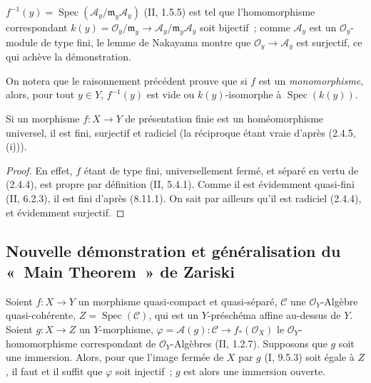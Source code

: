 $f^{-1}(y)=\operatorname{Spec}(\mathcal A_y/\mathfrak m_y\mathcal A_y)$
(II, 1.5.5) est tel que l'homomorphisme correspondant
$k(y)=\mathcal O_y/\mathfrak m_y\to
\mathcal A_y/\mathfrak m_y\mathcal A_y$ soit bijectif~; comme $\mathcal A_y$
est un $\mathcal O_y$-module de type fini, le lemme de Nakayama montre que
$\mathcal O_y\to\mathcal A_y$ est surjectif, ce qui achève la démonstration.

\begin{remark}[8.11.5.1]
\label{IV.8.11.5.1-fr}
On notera que le raisonnement précédent prouve que si $f$ est un
\emph{monomorphisme}, alors, pour tout $y\in Y$, $f^{-1}(y)$ est vide ou
$k(y)$-isomorphe à $\operatorname{Spec}(k(y))$.
\end{remark}

\begin{proposition}[8.11.6]
\label{IV.8.11.6-fr}
Si un morphisme $f:X\to Y$ de présentation finie est un homéomorphisme
universel, il est fini, surjectif et radiciel (la réciproque étant vraie
d'après (2.4.5, (i))).
\end{proposition}

\begin{proof}
En effet, $f$ étant de type fini, universellement fermé, et séparé en vertu de
(2.4.4), est propre par définition (II, 5.4.1). Comme il est évidemment
quasi-fini (II, 6.2.3), il est fini d'après (8.11.1). On sait par ailleurs
qu'il est radiciel (2.4.4), et évidemment surjectif.
\end{proof}

\subsection{Nouvelle démonstration et généralisation du «~Main Theorem~» de Zariski}
\label{subsection:IV.8.12-fr}
\label{IV.8.12-fr}

\begin{lemma}[8.12.1]
\label{IV.8.12.1-fr}
Soient $f:X\to Y$ un morphisme quasi-compact et quasi-séparé, $\mathcal C$ une
$\mathcal O_Y$-Algèbre quasi-cohérente, $Z=\operatorname{Spec}(\mathcal C)$,
qui est un $Y$-préschéma affine au-dessus de $Y$. Soient $g:X\to Z$ un
$Y$-morphisme, $\varphi=\mathcal A(g):\mathcal C\to f_*(\mathcal O_X)$ le
$\mathcal O_Y$-homomorphisme correspondant de $\mathcal O_Y$-Algèbres
(II, 1.2.7). Supposons que $g$ soit une immersion. Alors, pour que l'image
fermée de $X$ par $g$ (I, 9.5.3) soit égale à $Z$, il faut et il suffit que
$\varphi$ soit injectif~; $g$ est alors une immersion ouverte.
\end{lemma}

